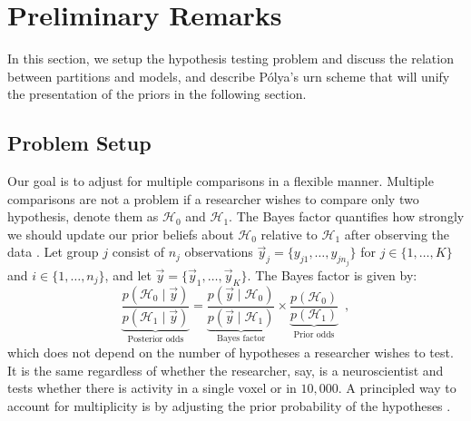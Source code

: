 \documentclass[11pt,a4paper]{article}
\theoremstyle{definition} %
\theoremstyle{case}
\begin{document}



\section{Preliminary Remarks} \label{sec:setup}
In this section, we setup the hypothesis testing problem and discuss the relation between partitions and models, and describe P\'{o}lya's urn scheme that will unify the presentation of the priors in the following section. 

\subsection{Problem Setup}
Our goal is to adjust for multiple comparisons in a flexible manner. Multiple comparisons are not a problem if a researcher wishes to compare only two hypothesis, denote them as $\mathcal{H}_0$ and $\mathcal{H}_1$. The Bayes factor quantifies how strongly we should update our prior beliefs about $\mathcal{H}_0$ relative to $\mathcal{H}_1$ after observing the data \parencite{kass1995bayes, ly2016harold}. Let group $j$ consist of $n_j$ observations $\vec{y}_j = \{y_{j1}, \ldots, y_{jn_j}\}$ for $j \in \{1, \ldots, K\}$ and $i \in \{1, \ldots, n_j\}$, and let $\vec{y} = \{\vec{y}_1, \ldots ,\vec{y}_K\}$. The Bayes factor is given by:
\begin{equation}
    \underbrace{\frac{p(\mathcal{H}_0 \mid \vec{y})}{p(\mathcal{H}_1 \mid \vec{y})}}_{\text{Posterior odds}} = \underbrace{\frac{p(\vec{y} \mid \mathcal{H}_0)}{p(\vec{y} \mid \mathcal{H}_1)}}_{\text{Bayes factor}} \times \underbrace{\frac{p(\mathcal{H}_0)}{p(\mathcal{H}_1)}}_{\text{Prior odds}} \enspace ,
\end{equation}
which does not depend on the number of hypotheses a researcher wishes to test. It is the same regardless of whether the researcher, say, is a neuroscientist and tests whether there is activity in a single voxel or in $10,000$. A principled way to account for multiplicity is by adjusting the prior probability of the hypotheses \parencite[e.g.,][]{jeffreys1961theory, westfall1997bayesian}.
\end{document}
